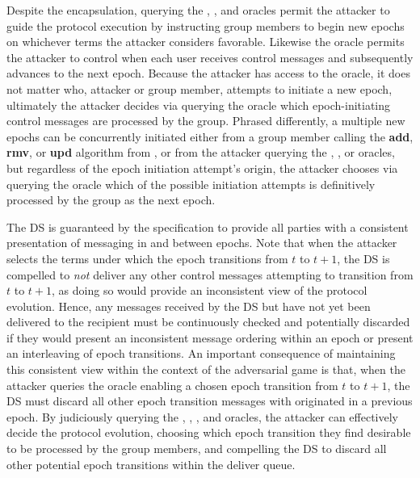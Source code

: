 Despite the encapsulation, querying the , , and  oracles permit the attacker to guide the protocol execution by instructing group members to begin new epochs on whichever terms the attacker considers favorable.
Likewise the  oracle permits the attacker to control when each user receives control messages and subsequently advances to the next epoch.
Because the attacker has access to the  oracle, it does not matter who, attacker or group member, attempts to initiate a new epoch, ultimately the attacker decides via querying the  oracle which epoch-initiating control messages are processed by the group.
Phrased differently, a multiple new epochs can be concurrently initiated either from a group member calling the \textbf{add}, \textbf{rmv}, or \textbf{upd} algorithm from \CGKAdef, or from the attacker querying the , , or  oracles, but regardless of the epoch initiation attempt's origin, the attacker chooses via querying the  oracle which of the possible initiation attempts is definitively processed by the group as the next epoch.

The DS is guaranteed by the  specification to provide all parties with a consistent presentation of messaging in and between epochs.
Note that when the attacker selects the terms under which the epoch transitions from \(t\) to \(t+1\), the DS is compelled to \emph{not} deliver any other control messages attempting to transition from \(t\) to \(t+1\), as doing so would provide an inconsistent view of the protocol evolution.
Hence, any messages received by the DS but have not yet been delivered to the recipient must be continuously checked and potentially discarded if they would present an inconsistent message ordering within an epoch or present an interleaving of epoch transitions.
An important consequence of maintaining this consistent view within the context of the adversarial  game is that, when the attacker queries the  oracle enabling a chosen epoch transition from \(t\) to \(t+1\), the DS must discard all other epoch transition messages with originated in a previous epoch.
By judiciously querying the , , , and  oracles, the attacker can effectively decide the protocol evolution, choosing which epoch transition they find desirable to be processed by the group members, and compelling the DS to discard all other potential epoch transitions within the deliver queue.

